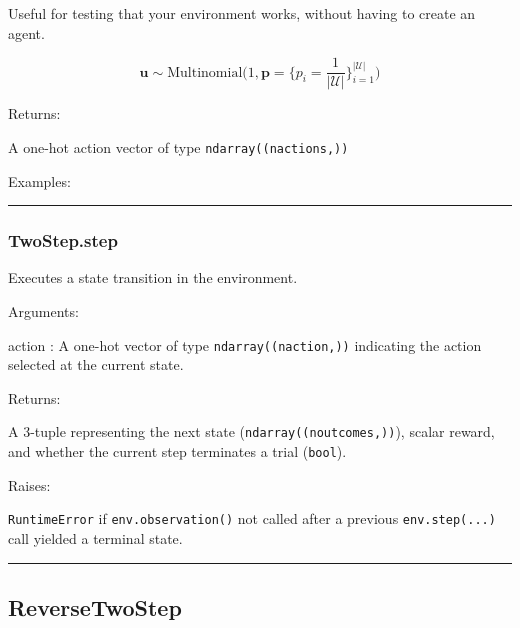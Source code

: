 Useful for testing that your environment works, without having to create
an agent.

\[
\mathbf u \sim \mathrm{Multinomial}\Big(1, \mathbf p=\{p_i = \frac{1}{|\mathcal U|}\}_{i=1}^{|\mathcal U|}\Big)
\]

Returns:

A one-hot action vector of type \texttt{ndarray((nactions,))}

Examples:

\begin{Shaded}
\begin{Highlighting}[]
\OperatorTok{=}
\end{Highlighting}
\end{Shaded}

\begin{center}\rule{0.5\linewidth}{\linethickness}\end{center}

\hypertarget{twostep.step}{%
\subsubsection{TwoStep.step}\label{twostep.step}}

\begin{Shaded}
\begin{Highlighting}[]
\end{Highlighting}
\end{Shaded}

Executes a state transition in the environment.

Arguments:

action : A one-hot vector of type \texttt{ndarray((naction,))}
indicating the action selected at the current state.

Returns:

A 3-tuple representing the next state (\texttt{ndarray((noutcomes,))}),
scalar reward, and whether the current step terminates a trial
(\texttt{bool}).

Raises:

\texttt{RuntimeError} if \texttt{env.observation()} not called after a
previous \texttt{env.step(...)} call yielded a terminal state.

\begin{center}\rule{0.5\linewidth}{\linethickness}\end{center}

\hypertarget{reversetwostep}{%
\subsection{ReverseTwoStep}\label{reversetwostep}}

